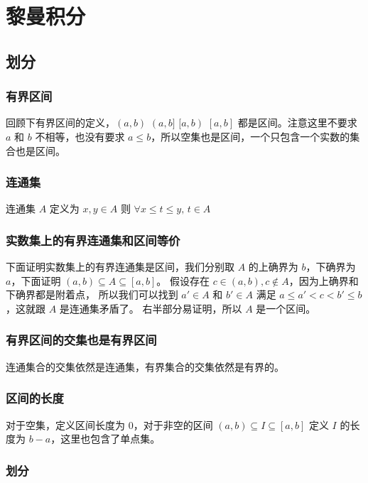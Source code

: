 \chapter{黎曼积分}

\section{划分}

\subsection{有界区间}

回顾下有界区间的定义，$(a,b) \,\, (a,b] \,\, [a,b) \,\, [a,b]$ 都是区间。注意这里不要求 $a$ 和 $b$ 不相等，也没有要求 $a \le b$，所以空集也是区间，一个只包含一个实数的集合也是区间。

\subsection{连通集}

连通集 $A$ 定义为 $x, y \in A$ 则 $\forall x \le t \le y, \, t \in A$ 

\subsection{实数集上的有界连通集和区间等价}

下面证明实数集上的有界连通集是区间，我们分别取 $A$ 的上确界为 $b$，下确界为 $a$，下面证明 $(a,b) \subseteq A \subseteq [a,b]$。
假设存在 $c \in (a,b), c \notin A$，因为上确界和下确界都是附着点，
所以我们可以找到 $a' \in A $ 和 $b' \in A$ 满足 $a \le a' < c < b' \le b$，这就跟 $A$ 是连通集矛盾了。
右半部分易证明，所以 $A$ 是一个区间。

\subsection{有界区间的交集也是有界区间}

连通集合的交集依然是连通集，有界集合的交集依然是有界的。


\subsection{区间的长度}

对于空集，定义区间长度为 $0$，对于非空的区间 $(a,b) \subseteq I \subseteq [a,b]$ 定义 $I$ 的长度为 $b-a$，这里也包含了单点集。

\subsection{划分}


